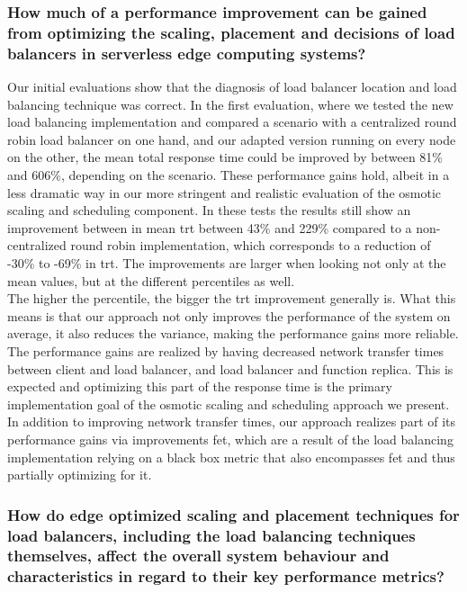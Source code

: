 \documentclass[draft,final]{vutinfth} %
\begin{document}
\subsubsection{How much of a performance improvement can be gained from optimizing the scaling, placement and decisions of load balancers in serverless edge computing systems?}

Our initial evaluations show that the diagnosis of load balancer location and load balancing technique was correct.
In the first evaluation, where we tested the new load balancing implementation and compared a scenario with a centralized round robin load balancer on one hand, and our adapted version running on every node on the other, the mean total response time could be improved by between 81\% and 606\%, depending on the scenario.
These performance gains hold, albeit in a less dramatic way in our more stringent and realistic evaluation of the osmotic scaling and scheduling component.
In these tests the results still show an improvement between in mean \gls{trt} between 43\% and 229\% compared to a non-centralized round robin implementation, which corresponds to a reduction of -30\% to -69\% in \gls{trt}.
The improvements are larger when looking not only at the mean values, but at the different percentiles as well.\\
The higher the percentile, the bigger the \gls{trt} improvement generally is.
What this means is that our approach not only improves the performance of the system on average, it also reduces the variance, making the performance gains more reliable.
The performance gains are realized by having decreased network transfer times between client and load balancer, and load balancer and function replica.
This is expected and optimizing this part of the response time is the primary implementation goal of the osmotic scaling and scheduling approach we present.
In addition to improving network transfer times, our approach realizes part of its performance gains via improvements \gls{fet}, which are a result of the load balancing implementation relying on a black box metric that also encompasses \gls{fet} and thus partially optimizing for it.

\subsubsection{How do edge optimized scaling and placement techniques for load balancers, including the load balancing techniques themselves, affect the overall system behaviour
and characteristics in regard to their key performance metrics?}
\end{document}
